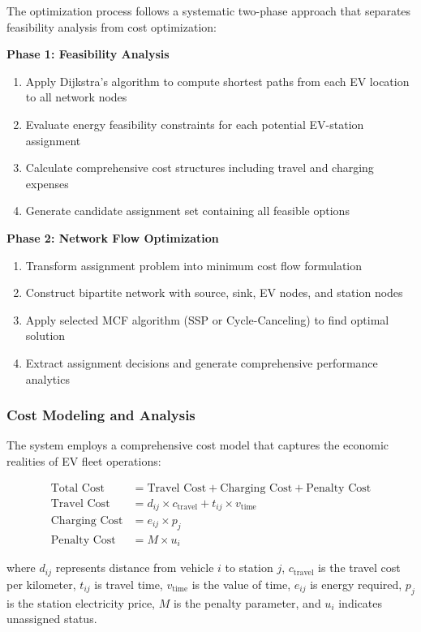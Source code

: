 \documentclass[12pt,a4paper]{article}
\begin{document}
The optimization process follows a systematic two-phase approach that separates feasibility analysis from cost optimization:

\textbf{Phase 1: Feasibility Analysis}
\begin{enumerate}
\item Apply Dijkstra's algorithm to compute shortest paths from each EV location to all network nodes
\item Evaluate energy feasibility constraints for each potential EV-station assignment
\item Calculate comprehensive cost structures including travel and charging expenses
\item Generate candidate assignment set containing all feasible options
\end{enumerate}

\textbf{Phase 2: Network Flow Optimization}
\begin{enumerate}
\item Transform assignment problem into minimum cost flow formulation
\item Construct bipartite network with source, sink, EV nodes, and station nodes
\item Apply selected MCF algorithm (SSP or Cycle-Canceling) to find optimal solution
\item Extract assignment decisions and generate comprehensive performance analytics
\end{enumerate}

\subsubsection{Cost Modeling and Analysis}

The system employs a comprehensive cost model that captures the economic realities of EV fleet operations:

\begin{align}
\text{Total Cost} &= \text{Travel Cost} + \text{Charging Cost} + \text{Penalty Cost}\\
\text{Travel Cost} &= d_{ij} \times c_{\text{travel}} + t_{ij} \times v_{\text{time}}\\
\text{Charging Cost} &= e_{ij} \times p_j\\
\text{Penalty Cost} &= M \times u_i
\end{align}

where $d_{ij}$ represents distance from vehicle $i$ to station $j$, $c_{\text{travel}}$ is the travel cost per kilometer, $t_{ij}$ is travel time, $v_{\text{time}}$ is the value of time, $e_{ij}$ is energy required, $p_j$ is the station electricity price, $M$ is the penalty parameter, and $u_i$ indicates unassigned status.
\end{document}
